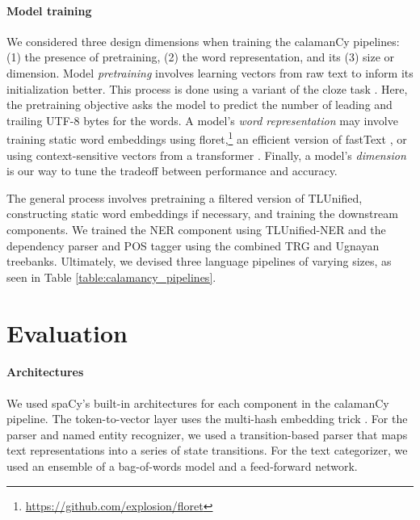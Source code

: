 \documentclass[11pt]{article}
\begin{document}


\paragraph*{Model training}

We considered three design dimensions when training the calamanCy pipelines: (1) the presence of pretraining, (2) the word representation, and its (3) size or dimension.
Model \textit{pretraining} involves learning vectors from raw text to inform its initialization better.
This process is done using a variant of the cloze task \citep{Devlin2019BERTPO}.
Here, the pretraining objective asks the model to predict the number of leading and trailing UTF-8 bytes for the words.
A model's \textit{word representation} may involve training static word embeddings using floret,\footnote[3]{\url{https://github.com/explosion/floret}} an efficient version of fastText \citep{Bojanowski2016EnrichingWV}, or using context-sensitive vectors from a transformer \citep{Vaswani2017AttentionIA}.
Finally, a model's \textit{dimension} is our way to tune the tradeoff between performance and accuracy.

The general process involves pretraining a filtered version of TLUnified, constructing static word embeddings if necessary, and training the downstream components.
We trained the NER component using TLUnified-NER and the dependency parser and POS tagger using the combined TRG and Ugnayan treebanks.
Ultimately, we devised three language pipelines of varying sizes, as seen in Table \ref{table:calamancy_pipelines}.

\section{Evaluation}



\paragraph*{Architectures}

We used spaCy's built-in architectures for each component in the calamanCy pipeline.
The token-to-vector layer uses the multi-hash embedding trick \citep{Miranda2022MultiHE}.
For the parser and named entity recognizer, we used a transition-based parser that maps text representations into a series of state transitions.
For the text categorizer, we used an ensemble of a bag-of-words model and a feed-forward network.
\end{document}
